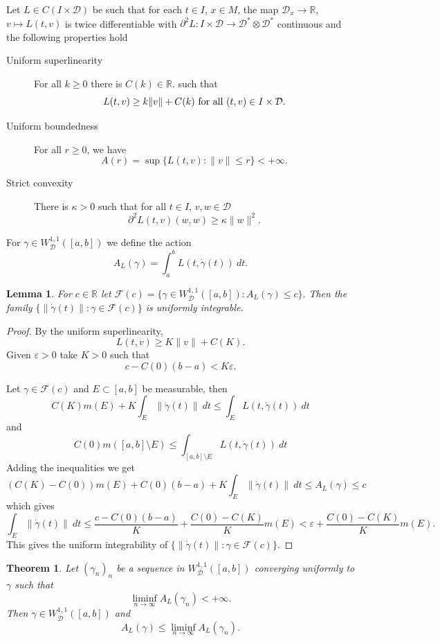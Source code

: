 \documentclass[10pt,a4paper]{amsart}
\newtheorem{theorem}{Theorem}
\newtheorem{lemma}{Lemma}
\newcommand{\R}{\mathbb R}
\newcommand{\cD}{\mathcal D}
\newcommand{\cW}{W^{1,1}}
\newcommand{\cWD}{\cW_\cD}
\newcommand{\cF}{\mathcal F}
\newcommand{\ep}{\varepsilon}
\newcommand{\ga}{\gamma}
\newcommand{\ka}{\kappa}
\newcommand{\dga}{\dot\gamma}
\newcommand{\entre}{\setminus}
\begin{document}
Let $L\in C(I\times\cD)$ be such that for each
$t\in I$, $x\in M$, the map $\cD_x\to\R$, $v\mapsto L(t,v)$ is twice
differentiable with $\partial^2L:I\times\cD\to\cD^*\otimes\cD^*$ 
continuous and the following properties hold
\begin{description}
\item [Uniform superlinearity] For all $k\ge 0$ there is $C(k)\in\R$.
  such that \[L(t,v)\ge k\|v\|+C(k)\hbox{ for all }(t,v)\in I\times\cD.\]
\item [Uniform boundedness] For all $r\ge 0$, we have
  \[A(r)=\sup\{L(t,v):\|v\|\le r\}<+\infty.\]
\item [Strict convexity] There is  $\ka>0$ such that for all  $t\in I$, $v,w\in\cD$ 
 \[\partial^2L (t,v)(w,w)\ge\ka\|w\|^2.\]  
\end{description}
For $\ga\in\cWD([a,b])$ we define the action
\[A_L(\ga)=\int_a^bL(t,\dga(t))\ dt.\]
\begin{lemma}\label{UI}
  For $c\in\R$ let
  $\cF(c)=\{\ga\in\cWD([a,b]): A_L(\ga)\le c\}.$
  Then the family
  $\{\|\dga(t)\|:\ga\in\cF(c)\}$ is uniformly integrable.
\end{lemma}
\begin{proof}
 By the uniform superlinearity,
      \[L(t,v)\ge K\|v\|+C(K).\]
      Given $\ep>0$ take $K>0$ such that 
  $$c-C(0)(b-a)<K\ep.$$

  Let $\ga\in\cF(c)$ and $E\subset[a,b]$ be measurable, then  
\[C(K)m(E)+K\int_E\|\dga(t)\|\ dt
   \le\int_E L(t,\dga(t))\ dt\]
and
   \[C(0)m([a,b]\entre E)\le \int_{[a,b]\entre E} L(t,\dga(t))\ dt \]
  Adding the inequalities we get 
  \[(C(K)-C(0))m(E)+C(0)(b-a)+K\int_E
    \|\dga(t)\|\ dt    \le A_L(\ga)\le c\]
which gives
\[\int_E\|\dga(t)\|\ dt\le\frac{c-C(0)(b-a)}K+
  \frac{C(0)-C(K)}Km(E) <\ep+\frac{C(0)-C(K)}{K}m(E).\]
This gives the uniform integrability of $\{\|\dga(t)\|:\ga\in\cF(c)\}$.
\end{proof}
  

\begin{theorem}\label{Cle}
   Let $(\ga_n)_n$ be a sequence in $\cWD([a,b])$ converging uniformly to
   $\ga$ such that
   \[\liminf_{n\to\infty}A_L(\ga_n)<+\infty.\]
   Then $\ga\in\cWD([a,b])$ and
\[A_L(\ga)\le \liminf_{n\to\infty}A_L(\ga_n).\]
\end{theorem}
\end{document}
